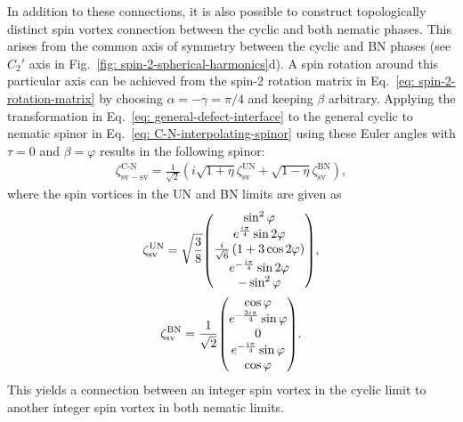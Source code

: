 In addition to these connections, it is also possible to construct topologically
distinct spin vortex connection between the cyclic and both nematic phases.
This arises from the common axis of symmetry between the cyclic and BN phases
(see \(C_2'\) axis in Fig.~\ref{fig: spin-2-spherical-harmonics}d).
A spin rotation around this particular axis can be achieved from the spin-2
rotation matrix in Eq.~\eqref{eq: spin-2-rotation-matrix} by choosing
\(\alpha = -\gamma =\pi / 4\) and keeping \(\beta \) arbitrary.
Applying the transformation in Eq.~\eqref{eq: general-defect-interface} to the
general cyclic to nematic spinor in Eq.~\eqref{eq: C-N-interpolating-spinor}
using these Euler angles with \(\tau=0\) and \(\beta = \varphi \) results in
the following spinor:
\begin{align}
    \zeta^\text{C-N}_\mathrm{sv-sv} = \frac{1}{\sqrt{2}}\left(
    i\sqrt{1+\eta}\zeta^\mathrm{UN}_\mathrm{sv} +
    \sqrt{1-\eta}\zeta^\mathrm{BN}_\mathrm{sv}
    \right), \label{eq: C-BN-sv-sv}
\end{align}
where the spin vortices in the UN and BN limits are given as
\begin{gather}
    \zeta^\mathrm{UN}_\mathrm{sv} = \sqrt{\frac{3}{8}}
    \mqty(
    \sin^2 \varphi \\
    e^{\frac{i\pi }{4}} \sin 2\varphi \\
    \frac{i}{\sqrt{6}}\left(1 + 3\cos 2\varphi \right)\\
    e^{-\frac{i \pi }{4}} \sin2 \varphi \\
    -\sin^2 \varphi
    ), \\
    \zeta^\mathrm{BN}_\mathrm{sv} = \frac{1}{\sqrt{2}}
    \mqty(
    \cos \varphi \\
    e^{-\frac{3i\pi }{4}} \sin \varphi \\
    0\\
    e^{-\frac{i \pi }{4}} \sin \varphi \\
    \cos \varphi
    ).
\end{gather}
This yields a connection between an integer spin vortex in the cyclic limit to
another integer spin vortex in both nematic limits.

